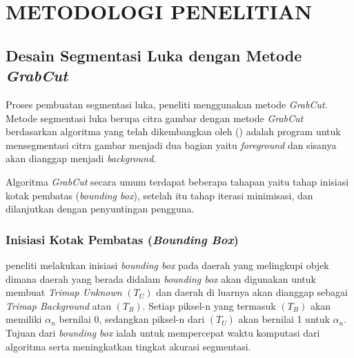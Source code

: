 
\chapter{METODOLOGI PENELITIAN}

\section{Desain Segmentasi Luka dengan Metode \emph{GrabCut}}
Proses pembuatan segmentasi luka, peneliti menggunakan metode 
\emph{GrabCut}. Metode segmentasi luka berupa citra gambar dengan metode \emph{GrabCut} 
berdasarkan algoritma yang telah dikembangkan oleh (\cite{Rother:2004}) adalah program 
untuk mensegmentasi citra gambar menjadi dua bagian yaitu \emph{foreground} dan
sisanya akan dianggap menjadi \emph{background}. 

Algoritma \emph{GrabCut} secara umum terdapat beberapa tahapan yaitu tahap inisiasi
kotak pembatas (\emph{bounding box}), setelah itu tahap iterasi minimisasi, dan dilanjutkan
dengan penyuntingan pengguna.

\subsection{Inisiasi Kotak Pembatas (\emph{Bounding Box})}
peneliti melakukan inisiasi \emph{bounding box} pada daerah yang melingkupi objek 
dimana daerah yang berada didalam \emph{bounding box} akan digunakan untuk membuat 
\emph{Trimap Unknown} \((T_{U})\) dan daerah di luarnya akan dianggap sebagai \emph{Trimap Background} 
atau \((T_{B})\). Setiap piksel-n yang termasuk \((T_{B})\) akan memiliki \(\alpha_{n}\) 
bernilai 0, sedangkan piksel-n dari \((T_{U})\) akan bernilai 1 untuk \(\alpha_{n}\). 
Tujuan dari \emph{bounding box} ialah untuk mempercepat waktu komputasi dari 
algoritma serta meningkatkan tingkat akurasi segmentasi.

